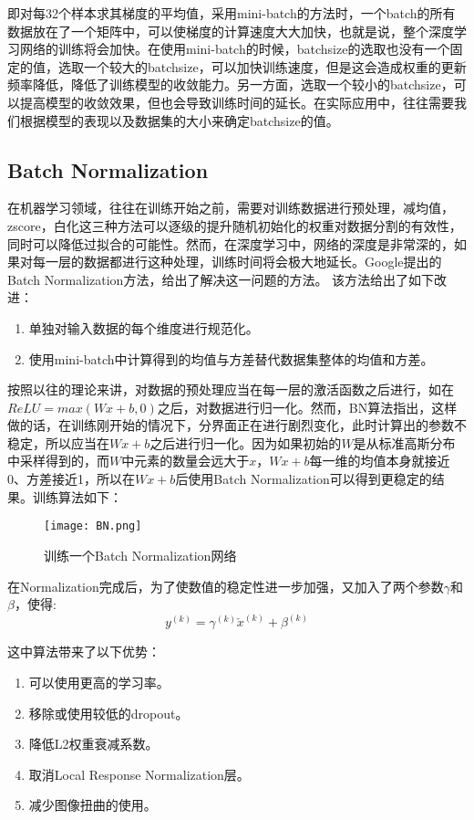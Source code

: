 即对每32个样本求其梯度的平均值，采用mini-batch的方法时，一个batch的所有数据放在了一个矩阵中，可以使梯度的计算速度大大加快，也就是说，整个深度学习网络的训练将会加快。在使用mini-batch的时候，batchsize的选取也没有一个固定的值，选取一个较大的batchsize，可以加快训练速度，但是这会造成权重的更新频率降低，降低了训练模型的收敛能力。另一方面，选取一个较小的batchsize，可以提高模型的收敛效果，但也会导致训练时间的延长。在实际应用中，往往需要我们根据模型的表现以及数据集的大小来确定batchsize的值。

\subsection{Batch Normalization}
在机器学习领域，往往在训练开始之前，需要对训练数据进行预处理，减均值，zscore，白化这三种方法可以逐级的提升随机初始化的权重对数据分割的有效性，同时可以降低过拟合的可能性。然而，在深度学习中，网络的深度是非常深的，如果对每一层的数据都进行这种处理，训练时间将会极大地延长。Google提出的Batch Normalization方法，给出了解决这一问题的方法。
该方法给出了如下改进：
\begin{enumerate}
    \item 单独对输入数据的每个维度进行规范化。
    \item 使用mini-batch中计算得到的均值与方差替代数据集整体的均值和方差。
\end{enumerate}

按照以往的理论来讲，对数据的预处理应当在每一层的激活函数之后进行，如在$ReLU=max(Wx+b,0)$之后，对数据进行归一化。然而，BN算法指出，这样做的话，在训练刚开始的情况下，分界面正在进行剧烈变化，此时计算出的参数不稳定，所以应当在$Wx+b$之后进行归一化。因为如果初始的$W$是从标准高斯分布中采样得到的，而$W$中元素的数量会远大于$x$，$Wx+b$每一维的均值本身就接近0、方差接近1，所以在$Wx+b$后使用Batch Normalization可以得到更稳定的结果。训练算法如下：
\begin{figure}[H]
    \centering
    \texttt{[image: BN.png]}
    \caption{训练一个Batch Normalization网络}
    \label{fig:BN}
\end{figure}
在Normalization完成后，为了使数值的稳定性进一步加强，又加入了两个参数$\gamma$和$\beta$，使得:
\begin{equation}
    y^{(k)} = \gamma ^{(k)}\check{x}^{(k)} + \beta ^{(k)}
\end{equation}

这中算法带来了以下优势：
\begin{enumerate}
    \item 可以使用更高的学习率。
    \item 移除或使用较低的dropout。
    \item 降低L2权重衰减系数。
    \item 取消Local Response Normalization层。
    \item 减少图像扭曲的使用。
\end{enumerate}

